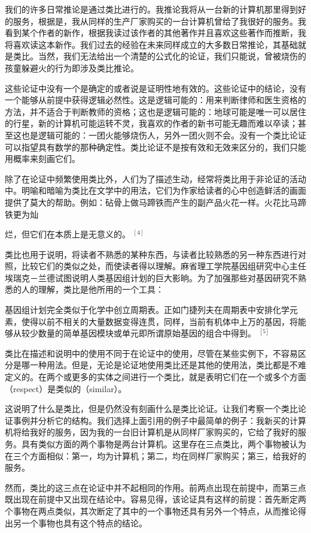 我们的许多日常推论是通过类比进行的。我推论我将从一台新的计算机那里得到好的服务，根据是，我从同样的生产厂家购买的一台计算机曾给了我很好的服务。我看到某个作者的新作，根据我读过该作者的其他著作并且喜欢这些著作而推断，我将喜欢读这本新作。我们过去的经验在未来同样成立的大多数日常推论，其基础就是类比。当然，我们无法给出一个清楚的公式化的论证，我们只能说，曾被烧伤的孩童躲避火的行为即涉及类比推论。

这些论证中没有一个是确定的或者说是证明性地有效的。这些论证中的结论，没有一个能够从前提中获得逻辑必然性。这是逻辑可能的：用来判断律师和医生资格的方法，并不适合于判断教师的资格；这也是逻辑可能的：地球可能是唯一可以居住的行星，新的计算机可能运转不灵，我喜欢的作者的新书可能无趣而难以卒读；甚至这也是逻辑可能的：一团火能够烧伤人，另外一团火则不会。没有一个类比论证可以指望具有数学的那种确定性。类比论证不是按有效和无效来区分的，我们只能用概率来刻画它们。

除了在论证中频繁使用类比外，人们为了描述生动，经常将类比用于非论证的活动中。明喻和暗喻为类比在文学中的用法，它们为作家给读者的心中创造鲜活的画面提供了莫大的帮助。例如：砧骨上做马蹄铁而产生的副产品火花一样。火花比马蹄铁更为灿

烂，但它们在本质上是无意义的。 ${ }^{[4]}$

类比也用于说明，将读者不熟悉的某种东西，与读者比较熟悉的另一种东西进行对照，比较它们的类似之处，而使读者得以理解。麻省理工学院基因组研究中心主任埃瑞克－兰德试图说明人类基因组计划的巨大影晌。为了加强那些对基因研究不熟悉的人的理解，类比是他所用的一个工具：

基因组计划完全类似于化学中创立周期表。正如门捷列夫在周期表中安排化学元素，使得以前不相关的大量数据变得连贯，同样，当前有机体中上万的基因，将能够从较少数量的简单基因模块或单元即所谓原始基因的组合中得到。 ${ }^{[5]}$

类比在描述和说明中的使用不同于在论证中的使用，尽管在某些实例下，不容易区分是哪一种用法。但是，无论是论证地使用类比还是其他的使用法，类比都是不难定义的。在两个或更多的实体之间进行一个类比，就是表明它们在一个或多个方面（respect）是类似的（similar）。

这说明了什么是类比，但是仍然没有刻画什么是类比论证。让我们考察一个类比论证事例并分析它的结构。我们选择上面引用的例子中最简单的例子：我新买的计算机将给我好的服务，因为我的一台旧计算机是从同样厂家购买的，它给了我好的服务。具有类似方面的两个事物是两台计算机。这里存在三点类比，两个事物被认为在三个方面相似：第一，均为计算机；第二，均在同样厂家购买；第三，给我好的服务。

然而，类比的这三点在论证中并不起相同的作用。前两点出现在前提中，而第三点既出现在前提中又出现在结论中。容易见得，该论证具有这样的前提：首先断定两个事物在两点类似，其次断定了其中的一个事物还具有另外一个特点，从而推论得出另一个事物也具有这个特点的结论。

